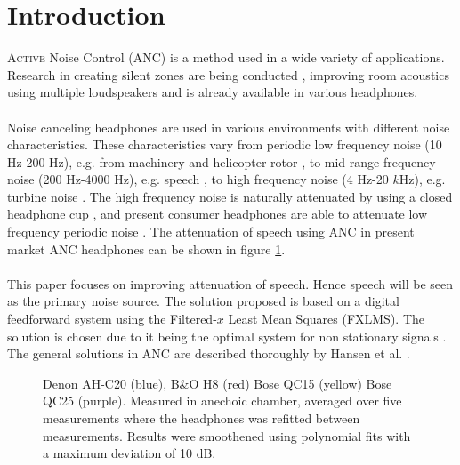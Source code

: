 \section*{Introduction}

\lettrine[lines=2]{A}{ctive} Noise Control 
(ANC) is a method used in a wide variety of applications. Research in creating silent zones are being conducted \cite{SilentZones}, improving room acoustics using multiple loudspeakers \cite{CAPS} and is already available in various headphones.
\\\\
Noise canceling headphones are used in various environments with different noise characteristics. These characteristics vary from periodic low frequency noise (10 Hz-200 Hz), e.g. from machinery and helicopter rotor \cite{LowFrequency}, to mid-range frequency noise (200 Hz-4000 Hz), e.g. speech \cite{MidFrequency}, to high frequency noise (4 Hz-20 $k$Hz), e.g. turbine noise \cite{LowFrequency}. The high frequency noise is naturally attenuated by using a closed headphone cup \cite{naturalAttenuation}, and present consumer headphones are able to attenuate low frequency periodic noise \cite{naturalAttenuation}. The attenuation of speech using ANC in present market ANC headphones can be shown in figure \ref{fig:ANCcompare}. \\\\


This paper focuses on improving attenuation of speech. Hence speech will be seen as the primary noise source. The solution proposed is based on a digital feedforward system using the Filtered-$x$ Least Mean Squares (FXLMS). The solution is chosen due to it being the optimal system for non stationary signals \cite{Hansen2}. The general solutions in ANC are described thoroughly by Hansen et al. \cite{Hansen}.

\begin{figure}[H]
	\centering
	
	\caption{Denon AH-C20 (blue), B\&O H8 (red) Bose QC15 (yellow) Bose QC25 (purple). Measured in anechoic chamber, averaged over five measurements where the headphones was refitted between measurements. Results were smoothened using polynomial fits with a maximum deviation of 10 dB.}
	\label{fig:ANCcompare}
\end{figure}



